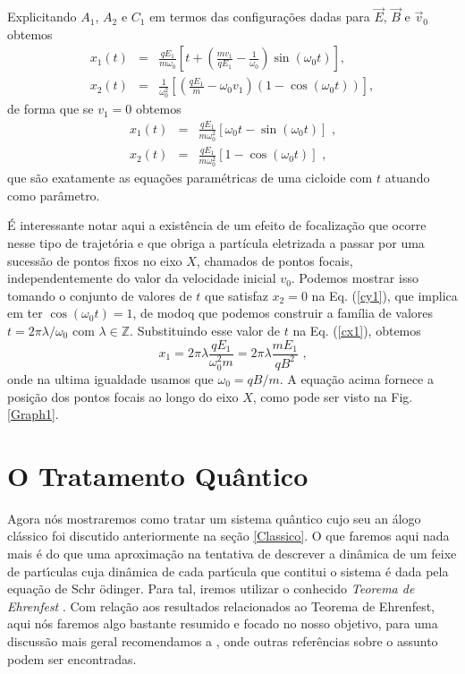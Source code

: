 \documentclass[twocolumn]{rbef}
\newcommand{\1}{\mathbbm{1}}
\begin{document}
Explicitando $A_{1}$, $A_{2}$ e $C_{1}$ em termos das configurações
dadas para $\vec{E}$, $\vec{B}$ e $\vec{v}_{0}$ obtemos
\begin{eqnarray}
  x_{1}\left( t\right)  &=& \frac{qE_{1}}{m \omega_{0}}\left[t +\left( \frac{mv_{1}}{qE_{1}}-\frac{1}{\omega_{0}} \right)\sin \left( \omega_{0} t\right) \right] \label{cx1} , \\
  x_{2}\left(t\right)&=&\frac{1}{\omega_{0}^{2}}\left[(\frac{qE_{1}}{m}-\omega_{0}v_{1})(1 - \cos\left(\omega_{0}t\right))\right] , \label{cy1}
\end{eqnarray}%
de forma que se $v_{1}=0$ obtemos
\begin{eqnarray}
  x_{1}\left( t\right)  &=&\frac{qE_{1}}{m\omega_{0} ^{2}}\left[\omega_{0} t - \sin \left( \omega_{0} t\right) \right] \label{cx2}  \text{ ,}  \\
  x_{2}\left(t\right)&=&\frac{qE_{1}}{m\omega_{0}^{2}}\left[ 1  -\cos\left(\omega_{0}t\right)\right] \text{ ,}
                         \label{cy2}
\end{eqnarray}%
que são exatamente as equações paramétricas de uma cicloide com $t$
atuando como parâmetro.

É interessante notar aqui a existência de um efeito de focalização
\cite{Simoes} que ocorre nesse tipo de trajetória e que obriga a
partícula eletrizada a passar por uma sucessão de pontos fixos no eixo
$X$, chamados de pontos focais, independentemente do valor da velocidade
inicial $v_{0}$. Podemos mostrar isso tomando o conjunto de valores de
$t$ que satisfaz $x_{2}=0$ na Eq. (\ref{cy1}), que implica em ter
$\cos\left(\omega_{0}t\right)=1$, de modoq que podemos construir a
família de valores $t= 2 \pi\lambda / \omega_{0}$ com
$\lambda \in \mathbb{Z}$. Substituindo esse valor de $t$ na
Eq. (\ref{cx1}), obtemos
\begin{equation}
  x_{1}= 2\pi \lambda \dfrac{ q E_{1}}{\omega_{0}^2 m} = 2\pi \lambda \dfrac{ m E_{1}}{q B^2} \text{ ,}
  \label{pf}
\end{equation}
onde na ultima igualdade usamos que $\omega_{0}= qB / m$. A equação
acima fornece a posição dos pontos focais ao longo do eixo $X$, como
pode ser visto na Fig. \ref{Graph1}.

\section{O Tratamento Quântico} \label{Quantico}

Agora n\'{o}s mostraremos como tratar um sistema qu\^{a}ntico cujo seu
an%
\'{a}logo cl\'{a}ssico foi discutido anteriormente na se\c{c}\~{a}o
\ref{Classico}. O que faremos aqui nada mais \'{e} do que uma
aproxima\c{c}\~{a}o na tentativa de descrever a din\^{a}mica de um feixe
de part\'{\i}culas cuja din\^{a}mica de cada part\'{\i}cula que contitui
o sistema \'{e} dada pela equa\c{c}\~{a}o de Schr%
\"{o}dinger. Para tal, iremos utilizar o conhecido \textit{%
  Teorema de Ehrenfest} \cite{Ehrenfest}. Com rela\c{c}\~{a}o aos
resultados relacionados ao Teorema de Ehrenfest, aqui n\'{o}s faremos
algo bastante resumido e focado no nosso objetivo, para uma
discuss\~{a}o mais geral recomendamos a \cite{Bolivar}, onde outras
refer\^{e}ncias sobre o assunto podem ser encontradas.
\end{document}
